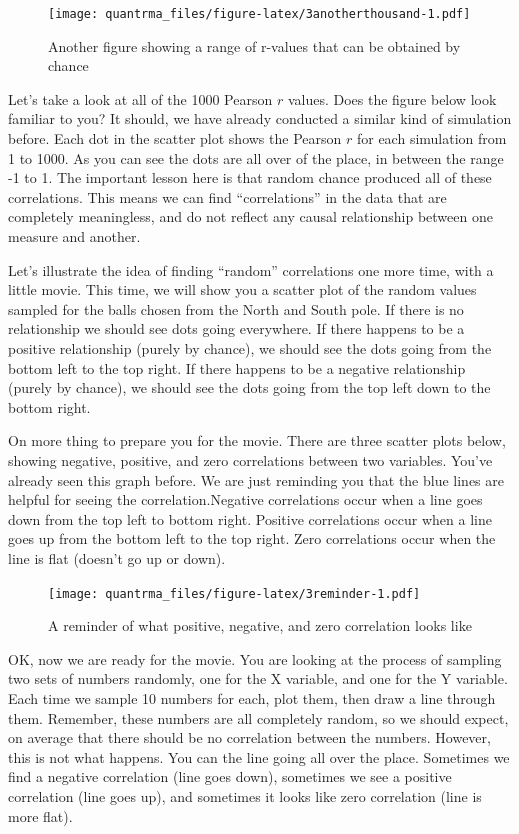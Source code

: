 \documentclass[
]{book}
\begin{document}
\begin{figure}
\centering
\texttt{[image: quantrma\_files/figure-latex/3anotherthousand-1.pdf]}
\caption{\label{fig:3anotherthousand}Another figure showing a range of r-values that can be obtained by chance}
\end{figure}

Let's take a look at all of the 1000 Pearson \(r\) values. Does the figure below look familiar to you? It should, we have already conducted a similar kind of simulation before. Each dot in the scatter plot shows the Pearson \(r\) for each simulation from 1 to 1000. As you can see the dots are all over of the place, in between the range -1 to 1. The important lesson here is that random chance produced all of these correlations. This means we can find ``correlations'' in the data that are completely meaningless, and do not reflect any causal relationship between one measure and another.

Let's illustrate the idea of finding ``random'' correlations one more time, with a little movie. This time, we will show you a scatter plot of the random values sampled for the balls chosen from the North and South pole. If there is no relationship we should see dots going everywhere. If there happens to be a positive relationship (purely by chance), we should see the dots going from the bottom left to the top right. If there happens to be a negative relationship (purely by chance), we should see the dots going from the top left down to the bottom right.

On more thing to prepare you for the movie. There are three scatter plots below, showing negative, positive, and zero correlations between two variables. You've already seen this graph before. We are just reminding you that the blue lines are helpful for seeing the correlation.Negative correlations occur when a line goes down from the top left to bottom right. Positive correlations occur when a line goes up from the bottom left to the top right. Zero correlations occur when the line is flat (doesn't go up or down).

\begin{figure}
\centering
\texttt{[image: quantrma\_files/figure-latex/3reminder-1.pdf]}
\caption{\label{fig:3reminder}A reminder of what positive, negative, and zero correlation looks like}
\end{figure}

OK, now we are ready for the movie. You are looking at the process of sampling two sets of numbers randomly, one for the X variable, and one for the Y variable. Each time we sample 10 numbers for each, plot them, then draw a line through them. Remember, these numbers are all completely random, so we should expect, on average that there should be no correlation between the numbers. However, this is not what happens. You can the line going all over the place. Sometimes we find a negative correlation (line goes down), sometimes we see a positive correlation (line goes up), and sometimes it looks like zero correlation (line is more flat).
\end{document}
